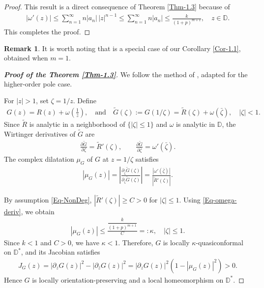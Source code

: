 \documentclass[a4paper,12pt]{amsart}
\theoremstyle{plain}
\theoremstyle{definition}
\newtheorem{rem}{Remark}[section]
\begin{document}
\begin{proof}
This result is a direct consequence of Theorem \ref{Thm-1.3} because of
	\begin{align*}
		|\omega'(z)| \leq \sum_{n=1}^{\infty} n|a_n|\,|z|^{n-1} 
		\leq \sum_{n=1}^{\infty} n|a_n| 
		\leq \frac{k}{(1+p)^{m+1}}, 
		\quad z \in \mathbb{D}.
	\end{align*}
	This completes the proof.
\end{proof}
\begin{rem}
	It is worth noting that \cite[Corollary 2]{Bhowmik-PAMS-2016} is a special case of our Corollary \ref{Cor-1.1}, obtained when $m=1$.
\end{rem}
\begin{proof}[\bf{Proof of the Theorem \ref{Thm-1.3}}]
	We follow the method of \cite[Theorem~2]{Bhowmik-PAMS-2016}, adapted for the higher-order pole case.
	
	For $|z| > 1$, set $\zeta = 1/z$. 
	Define
	\begin{align*}
		G(z) = R(z) + \omega\!\left( \frac{1}{\bar{z}} \right),
		\quad\text{and}\quad
		\widetilde{G}(\zeta) := G(1/\zeta) = \widetilde{R}(\zeta) + \omega(\bar{\zeta}), 
		\quad |\zeta| < 1.
	\end{align*}
	Since $\widetilde{R}$ is analytic in a neighborhood of $\{ |\zeta| \le 1 \}$ and $\omega$ is analytic in $\mathbb{D}$, 
	the Wirtinger derivatives of $\widetilde{G}$ are
	\begin{align*}
		\frac{\partial \widetilde{G}}{\partial \zeta} = \widetilde{R}'(\zeta),
		\qquad
		\frac{\partial \widetilde{G}}{\partial \bar{\zeta}} = \omega'(\bar{\zeta}).
	\end{align*}
	The complex dilatation $\mu_G$ of $G$ at $z = 1/\zeta$ satisfies
	\begin{align}\label{Eq-muG}
		|\mu_G(z)| 
		= \left| \frac{\partial_{\bar{\zeta}} \widetilde{G}(\zeta)}{\partial_{\zeta} \widetilde{G}(\zeta)} \right|
		= \frac{|\omega'(\bar{\zeta})|}{|\widetilde{R}'(\zeta)|}.
	\end{align}
	
	By assumption \eqref{Eq-NonDeg}, $|\widetilde{R}'(\zeta)| \ge C > 0$ for $|\zeta| \le 1$. 
	Using \eqref{Eq-omega-deriv}, we obtain
	\begin{align*}
		|\mu_G(z)| 
		\le \frac{\dfrac{k}{(1+p)^{m+1}}}{C}
		=: \kappa, \quad |\zeta| \le 1.
	\end{align*}
	Since $k < 1$ and $C > 0$, we have $\kappa < 1$. 
	Therefore, $G$ is locally $\kappa$-quasiconformal on $\mathbb{D}^*$, and its Jacobian satisfies
	\begin{align*}
		J_G(z)
		= |\partial_z G(z)|^2 - |\partial_{\bar{z}} G(z)|^2
		= |\partial_z G(z)|^2 (1 - |\mu_G(z)|^2) > 0.
	\end{align*}
	Hence $G$ is locally orientation-preserving and a local homeomorphism on $\mathbb{D}^*$.
	

\end{proof}
\end{document}
